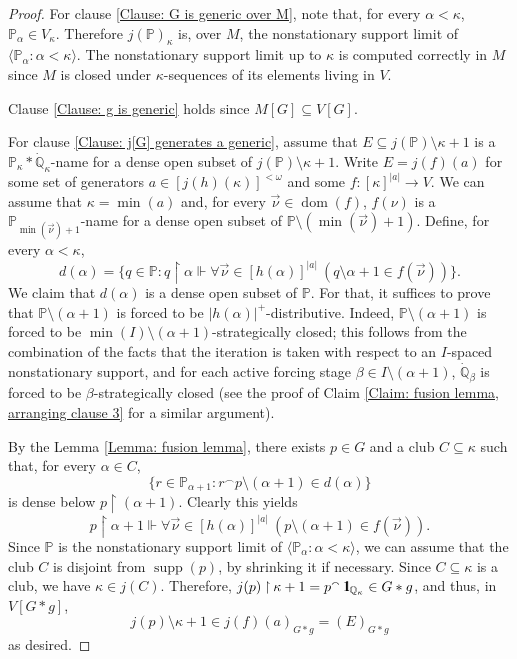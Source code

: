 \documentclass[11pt]{amsart}
\renewcommand{\restriction}{\mathbin\upharpoonright}    %
\theoremstyle{definition}
\theoremstyle{remark}
\newcommand\<{{<}}
\DeclareMathOperator{\supp}{supp}
\newcommand{\one}{\mathop{1\hskip-3pt {\rm l}}}
\newcommand{\dom}{\mathop{\mathrm{dom}}\nolimits}
\newcommand{\po}{\mathbb{P}}
\newcommand{\qo}{\mathbb{Q}}
\newcommand{\la}{\langle}
\newcommand{\ra}{\rangle}
\begin{document}
\begin{proof}
    For clause \eqref{Clause: G is generic over M}, note that, for every $\alpha<\kappa$, $\po_\alpha\in V_{\kappa}$. Therefore $j(\po)_{\kappa}$ is, over $M$, the nonstationary support limit of $\la \po_\alpha \colon \alpha<\kappa \ra$. The nonstationary support limit up to $\kappa$ is computed correctly in $M$ since $M$ is closed under $\kappa$-sequences of its elements living in $V$.

    \smallskip
    
    Clause \eqref{Clause: g is generic} holds since $M[G]\subseteq V[G]$. 

    \smallskip
    
    For clause \eqref{Clause: j[G] generates a generic}, 
    assume that $E\subseteq j(\po)\setminus \kappa+1$ is a $\po_{\kappa}*\dot{\qo}_\kappa$-name for a dense open subset of $j(\po)\setminus \kappa+1$. Write $E = j(f)(a)$ for some set of generators $a\in [j(h)(\kappa)]^{<\omega}$ and some $f\colon [\kappa]^{|a|}\to V$. We can assume that $\kappa = \min(a)$ and, for every $\vec{\nu}\in \dom(f)$, $f(\nu)$ is a $\po_{\min (\vec{\nu})+1}$-name for a dense open subset of $\po\setminus ( \min(\vec{\nu})+1 )$. Define, for every $\alpha<\kappa$, 
    $$d(\alpha) = \{ q\in \po \colon q\restriction \alpha \Vdash \forall \vec{\nu}\in [h(\alpha)]^{|a|} \ ( q\setminus \alpha+1\in f(\vec{\nu})) \}.$$
    We claim that $d(\alpha)$ is a dense open subset of $\po$. For that, it suffices to prove that $\po\setminus (\alpha+1)$ is forced to be $|h(\alpha)|^+$-distributive. Indeed, $\po\setminus (\alpha+1)$ is forced to be  $\min(I)\setminus (\alpha+1)$-strategically closed; this follows from the combination of the facts that the iteration is taken with respect to an $I$-spaced nonstationary support, and for each active forcing stage $\beta\in I\setminus (\alpha+1)$, $\dot{\qo}_\beta$ is forced to be $ \beta$-strategically closed (see the proof of Claim \ref{Claim: fusion lemma, arranging clause 3} for a similar argument).

    
    By the Lemma \ref{Lemma: fusion lemma}, there exists $p\in G$ and a club $C\subseteq \kappa$ such that, for every $\alpha\in C$,
    $$\{r\in \mathbb{P}_{\alpha+1}\colon r{}^\smallfrown p\setminus (\alpha+1)\in d(\alpha)\}$$
    is dense below $p\restriction (\alpha+1)$. Clearly this yields
    $$p\restriction \alpha+1 \Vdash \forall \vec{\nu}\in [h(\alpha)]^{|a|} \ ( p\setminus (\alpha+1)\in f(\vec{\nu})).  $$
    Since $\po$ is the nonstationary support limit of $\la \po_\alpha \colon \alpha<\kappa \ra$, we can assume that the club $C$ is disjoint from $\supp(p)$, by shrinking it if necessary. Since $C\subseteq \kappa$ is a club, we have $\kappa\in j(C)$. Therefore, $j(p)\restriction \kappa+1 = p^{\smallfrown} \one_{\qo_\kappa}\in G*g$, and thus, in $V[G*g]$, 
    $$j(p)\setminus \kappa+1 \in j(f)(a)_{G\ast g} = (E)_{G*g}$$
    as desired.


\end{proof}
\end{document}
